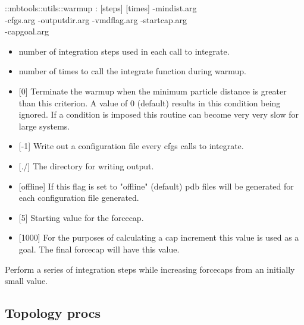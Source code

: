 \begin{code}    
  ::mbtools::utils::warmup  :  [steps] [times] -mindist.arg\\
             -cfgs.arg -outputdir.arg -vmdflag.arg -startcap.arg \\
             -capgoal.arg
\end{code}
\begin{itemize}
\item {} number of integration steps used in each call to
  integrate.
\item {} number of times to call the integrate function
  during warmup.
\item {} [0] Terminate the warmup when the minimum particle
  distance is greater than this criterion. A value of 0 (default)
  results in this condition being ignored. If a condition is imposed
  this routine can become very very slow for large systems.
\item {} [-1] Write out a configuration file every cfgs calls
  to integrate.
\item {} [./] The directory for writing output.
\item {} [offline] If this flag is set to "offline"
  (default) pdb files will be generated for each configuration file
  generated.
\item {} [5] Starting value for the forcecap.
\item {} [1000] For the purposes of calculating a cap
  increment this value is used as a goal. The final forcecap will have
  this value.
\end{itemize}
Perform a series of integration steps while increasing forcecaps from
an initially small value.

\subsection{Topology procs}

